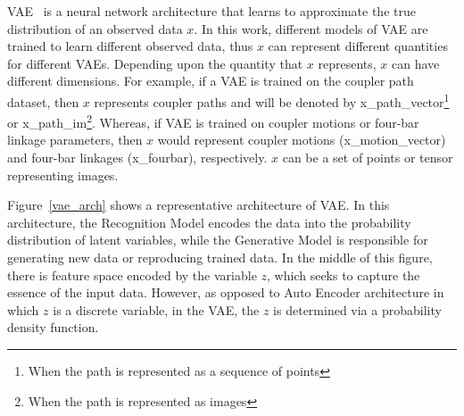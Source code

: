 VAE~\cite{Kingma2014AutoEncodingVB} is a neural network architecture that learns to approximate the true distribution of an observed data $x$.
In this work, different models of VAE are trained to learn different observed data, thus $x$ can represent different quantities for different VAEs.
Depending upon the quantity that $x$ represents, $x$ can have different dimensions.
For example, if a VAE is trained on the coupler path dataset, then $x$ represents coupler paths and will be denoted by \ac{x_path_vector}\footnote{When the path is represented as a sequence of points} or \ac{x_path_im}\footnote{When the path is represented as images}.
Whereas, if VAE is trained on coupler motions or four-bar linkage parameters, then $x$ would represent coupler motions (\ac{x_motion_vector}) and four-bar linkages (\ac{x_fourbar}), respectively. $x$ can be a set of points or tensor representing images.

Figure~\ref{vae_arch} shows a representative architecture of VAE. In this architecture, the Recognition Model encodes the data into the probability distribution of latent variables, while the Generative Model is responsible for generating new data or reproducing trained data.
In the middle of this figure, there is feature space encoded by the variable $z$, which seeks to capture the essence of the input data.  
However, as opposed to Auto Encoder architecture in which $z$ is a discrete variable, in the VAE, the $z$ is determined via a probability density function.

